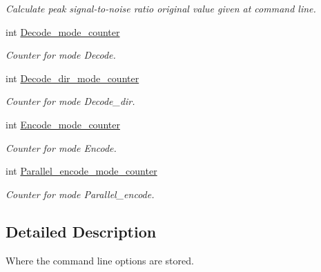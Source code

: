 \begin{DoxyCompactItemize}
\begin{DoxyCompactList}\small\item\em Calculate peak signal-\/to-\/noise ratio original value given at command line. \end{DoxyCompactList}\item 
\hypertarget{structgengetopt__args__info_a0c4314f1ef918378318309f3942ce848}{}int \hyperlink{structgengetopt__args__info_a0c4314f1ef918378318309f3942ce848}{Decode\+\_\+mode\+\_\+counter}\label{structgengetopt__args__info_a0c4314f1ef918378318309f3942ce848}

\begin{DoxyCompactList}\small\item\em Counter for mode Decode. \end{DoxyCompactList}\item 
\hypertarget{structgengetopt__args__info_a8c703d2d64038c6d7bb0bd81c5bd4660}{}int \hyperlink{structgengetopt__args__info_a8c703d2d64038c6d7bb0bd81c5bd4660}{Decode\+\_\+dir\+\_\+mode\+\_\+counter}\label{structgengetopt__args__info_a8c703d2d64038c6d7bb0bd81c5bd4660}

\begin{DoxyCompactList}\small\item\em Counter for mode Decode\+\_\+dir. \end{DoxyCompactList}\item 
\hypertarget{structgengetopt__args__info_a94fff809d0cd16f6eafe5d1ae3602bb8}{}int \hyperlink{structgengetopt__args__info_a94fff809d0cd16f6eafe5d1ae3602bb8}{Encode\+\_\+mode\+\_\+counter}\label{structgengetopt__args__info_a94fff809d0cd16f6eafe5d1ae3602bb8}

\begin{DoxyCompactList}\small\item\em Counter for mode Encode. \end{DoxyCompactList}\item 
\hypertarget{structgengetopt__args__info_ad5f11de443bb1cc476081537a344aad0}{}int \hyperlink{structgengetopt__args__info_ad5f11de443bb1cc476081537a344aad0}{Parallel\+\_\+encode\+\_\+mode\+\_\+counter}\label{structgengetopt__args__info_ad5f11de443bb1cc476081537a344aad0}

\begin{DoxyCompactList}\small\item\em Counter for mode Parallel\+\_\+encode. \end{DoxyCompactList}\end{DoxyCompactItemize}


\subsection{Detailed Description}
Where the command line options are stored. 

